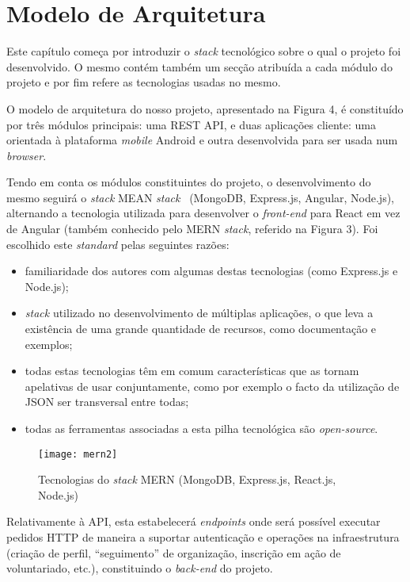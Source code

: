 \section{Modelo de Arquitetura} 
Este capítulo começa por introduzir o \textit{stack} tecnológico sobre o qual o projeto foi desenvolvido. O mesmo contém também um secção atribuída a cada módulo do projeto e por fim refere as tecnologias usadas no mesmo.
\par \medskip

O modelo de arquitetura do nosso projeto, apresentado na Figura 4, é constituído por três módulos principais: uma REST API, e duas aplicações cliente: uma orientada à plataforma \textit{mobile} Android e outra desenvolvida para ser usada num \textit{browser}. \par \medskip

Tendo em conta os módulos constituintes do projeto, o desenvolvimento do mesmo seguirá o \textit{stack} MEAN \textit{stack}~\cite{mean_stack_explained} (MongoDB, Express.js, Angular, Node.js), alternando a tecnologia utilizada para desenvolver o \textit{front-end} para React em vez de Angular (também conhecido pelo MERN \textit{stack}, referido na Figura 3). Foi escolhido este \textit{standard} pelas seguintes razões:
\begin{itemize}
	\item familiaridade dos autores com algumas destas tecnologias (como Express.js e Node.js);
	\item \textit{stack} utilizado no desenvolvimento de múltiplas aplicações, o que leva a existência de uma grande quantidade de recursos, como documentação e exemplos;
	\item todas estas tecnologias têm em comum características que as tornam apelativas de usar conjuntamente, como por exemplo o facto da utilização de JSON ser transversal entre todas;
	\item todas as ferramentas associadas a esta pilha tecnológica são \textit{open-source}.
\end{itemize}

\begin{figure}[h]
	\centering
	\texttt{[image: mern2]}
	\caption{Tecnologias do \textit{stack} MERN (MongoDB, Express.js, React.js, Node.js)}
\end{figure}

Relativamente à API, esta estabelecerá \textit{endpoints} onde será possível executar pedidos HTTP de maneira a suportar autenticação e operações na infraestrutura (criação de perfil, “seguimento” de organização, inscrição em ação de voluntariado, etc.), constituindo o \textit{back-end} do projeto.
\par \medskip

